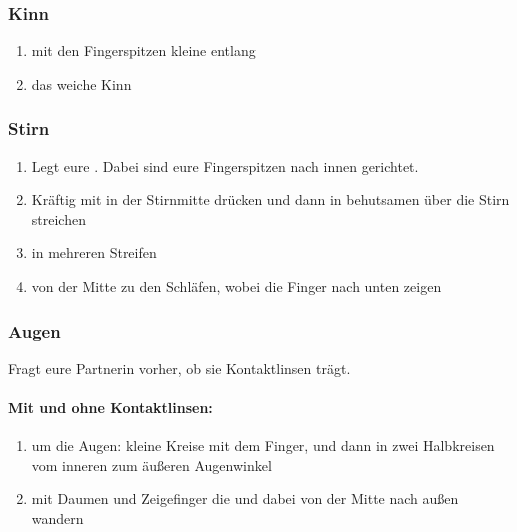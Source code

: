 \subsubsection{Kinn}
\begin{enumerate}
  \item mit den Fingerspitzen kleine  entlang
  \item das weiche Kinn 
\end{enumerate}


\subsubsection{Stirn}

\begin{enumerate}
  \item Legt eure . Dabei sind eure Fingerspitzen nach innen gerichtet.
  \item Kräftig mit  in der Stirnmitte drücken und dann in behutsamen  über die Stirn streichen
  \item {} in mehreren Streifen
  \item {} von der Mitte zu den Schläfen, wobei die Finger nach unten zeigen
\end{enumerate}
\pagebreak


\subsubsection{Augen}

Fragt eure Partnerin vorher, ob sie Kontaktlinsen trägt.

\paragraph{Mit und ohne Kontaktlinsen:}
\begin{enumerate}
  \item {} um die Augen: kleine Kreise mit dem Finger, und dann in zwei Halbkreisen vom inneren zum äußeren Augenwinkel
  \item mit Daumen und Zeigefinger die  und dabei von der Mitte nach außen wandern
\end{enumerate}

